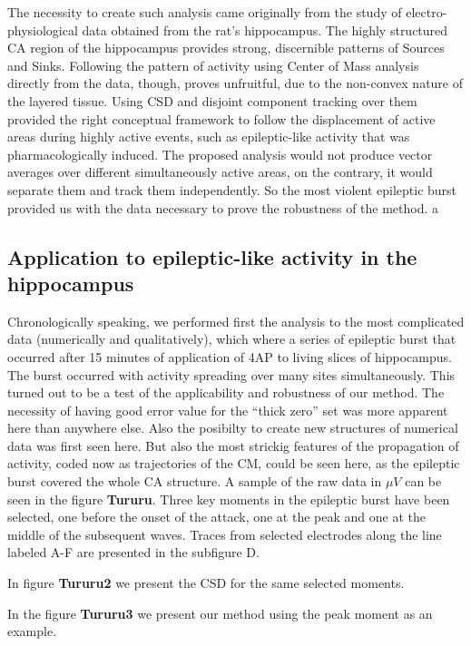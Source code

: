 \documentclass{article}
\begin{document}
The necessity to create such analysis came originally from the study of electro-physiological data obtained from the rat's hippocampus. The highly structured CA region of the hippocampus provides strong, discernible patterns of Sources and Sinks. Following the pattern of activity using Center of Mass analysis directly from the data, though, proves unfruitful, due to the non-convex nature of the layered tissue. Using CSD and disjoint component tracking over them provided the right conceptual framework to follow the displacement of active areas during highly active events, such as epileptic-like activity that was pharmacologically induced. The proposed analysis would not produce vector averages over different simultaneously active areas, on the contrary, it would separate them and track them independently. So the most violent epileptic burst provided us with the data necessary to prove the robustness of the method. 
a

\subsection{Application to epileptic-like activity in the hippocampus}
Chronologically speaking, we performed first the analysis to the most complicated data (numerically and qualitatively), which where a series of epileptic burst that occurred after 15 minutes of application of 4AP to living slices of hippocampus. The burst occurred with activity spreading over many sites simultaneously. This turned out to be a test of the applicability and robustness of our method. The necessity of having good error value for the ``thick zero'' set was more apparent here than anywhere else. Also the posibilty to create new structures of numerical data was first seen here.  But also the most strickig features of the propagation of activity, coded now as trajectories of the CM, could be seen here, as the epileptic burst covered the whole CA structure. A sample of the raw data in $\mu V$ can be seen in the figure \textbf{Tururu}. Three key moments in the epileptic burst have been selected, one before the onset of the attack, one at the peak and one at the middle of the subsequent waves. Traces from selected electrodes along the line labeled A-F are presented in the subfigure D. 

In figure \textbf{Tururu2} we present the CSD for the same selected moments.

In the figure \textbf{Tururu3} we present our method using the peak moment as an example. 
\end{document}
